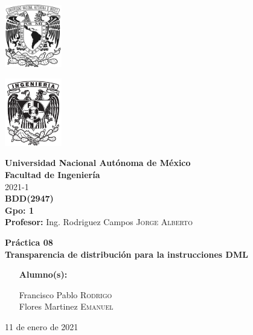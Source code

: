 \documentclass{article}
\newcommand{\materia}{BDD}
\newcommand{\clave}{2947}
\newcommand{\profesor}{Ing. Rodriguez Campos \textsc{Jorge Alberto}}
\newcommand{\semestre}{2021-1}
\newcommand{\alumno}{
    Francisco Pablo \textsc{Rodrigo}  \\ 
    Flores Martinez \textsc{Emanuel}   
}
\newcommand{\actividad}{Práctica 08}
\newcommand{\titulo}{Transparencia de distribución para la instrucciones DML}
\newcommand{\fechaEntrega}{11 de enero de 2021}
\begin{document}
\thispagestyle{empty}
\begin{minipage}[t][5cm][t]{0.2\linewidth}
    \includegraphics[width=2.5cm]{unam.jpg}
    \vspace{10cm}

    \includegraphics[width=2.5cm]{fiblack}
\end{minipage}
\begin{minipage}[t]{0.7\linewidth}
    \vspace{-2.5cm}
    \LARGE{\textbf{Universidad Nacional Autónoma de México}}\\
    \Large{\textbf{Facultad de Ingeniería}} \\

    \large{\semestre}\\[2cm]

    \large{\textbf{\materia (\clave)}}\\
    \large{\textbf{Gpo: 1}}\\[5mm]
    \large{\textbf{Profesor:} \profesor}\\ [1.5cm]
    \begin{center}
        \LARGE{\textbf{\actividad}}\\
        \LARGE{\textbf{\titulo}}\\
    \end{center}

    \vspace{3.3cm}

    \large{
        \begin{itemize}[
            noitemsep,
            align=left,
        ]
            \item [\textbf{Alumno(s):}] 
            \begin{flushright}
                \alumno
            \end{flushright}
        \end{itemize}
    } \vspace{1.5cm}

    \begin{flushright}
        \fechaEntrega%
    \end{flushright}
\end{minipage}
\end{document}
